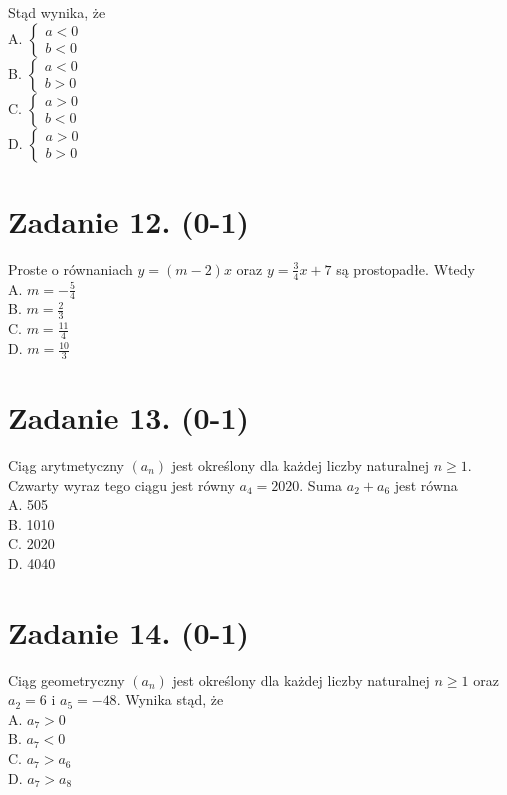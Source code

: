 \documentclass[10pt]{article}
\begin{document}
Stąd wynika, że\\
A. \(\left\{\begin{array}{l}a<0 \\ b<0\end{array}\right.\)\\
B. \(\left\{\begin{array}{l}a<0 \\ b>0\end{array}\right.\)\\
C. \(\left\{\begin{array}{l}a>0 \\ b<0\end{array}\right.\)\\
D. \(\left\{\begin{array}{l}a>0 \\ b>0\end{array}\right.\)

\section*{Zadanie 12. (0-1)}
Proste o równaniach \(y=(m-2) x\) oraz \(y=\frac{3}{4} x+7\) są prostopadłe. Wtedy\\
A. \(m=-\frac{5}{4}\)\\
B. \(m=\frac{2}{3}\)\\
C. \(m=\frac{11}{4}\)\\
D. \(m=\frac{10}{3}\)

\section*{Zadanie 13. (0-1)}
Ciąg arytmetyczny \(\left(a_{n}\right)\) jest określony dla każdej liczby naturalnej \(n \geq 1\). Czwarty wyraz tego ciągu jest równy \(a_{4}=2020\). Suma \(a_{2}+a_{6}\) jest równa\\
A. 505\\
B. 1010\\
C. 2020\\
D. 4040

\section*{Zadanie 14. (0-1)}
Ciąg geometryczny \(\left(a_{n}\right)\) jest określony dla każdej liczby naturalnej \(n \geq 1\) oraz \(a_{2}=6\) i \(a_{5}=-48\). Wynika stąd, że\\
A. \(a_{7}>0\)\\
B. \(a_{7}<0\)\\
C. \(a_{7}>a_{6}\)\\
D. \(a_{7}>a_{8}\)
\end{document}
